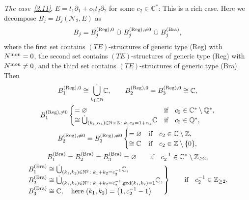 \documentclass[pdftex]{sigma}%
\numberwithin{equation}{section}
\numberwithin{figure}{section}
\newcommand{\N}{{\mathbb N}}
\newcommand{\Z}{{\mathbb Z}}
\newcommand{\Q}{{\mathbb Q}}
\newcommand{\C}{{\mathbb C}}
\newcommand{\NN}{{\mathcal N}}
\newcommand{\paa}{\partial}
\begin{document}
\begin{Remarks}
\begin{enumerate}
{\it The case~\eqref{2.11}}, $E=t_1\paa_1+c_2t_2\paa_2$
for some $c_2\in\C^*$: This is a rich case. Here we
decompose $B_j=B_j(\NN_2,E)$ as
\begin{gather*}%
B_j=B_j^{({\rm Reg}),0}
\ \dot\cup\ B_j^{({\rm Reg}),\neq 0}
\ \dot\cup\ B_j^{({\rm Bra})},
\end{gather*}
where the first set contains $(TE)$-structures of generic
type (Reg) with $N^{\rm mon}=0$, the second set contains
$(TE)$-structures of generic type (Reg) with $N^{\rm mon}\neq 0$,
and the third set contains $(TE)$-structures of
generic type (Bra). Then
\begin{gather*}%
B_1^{({\rm Reg}),0}\cong \dot{\bigcup\limits_{k_1\in\N}}\C,\qquad
B_2^{({\rm Reg}),0}=B_3^{({\rm Reg}),0}\cong\C,
\\
B_1^{({\rm Reg}),\neq 0}
\begin{cases}
=\varnothing&\text{if}\quad c_2\in\C^*\setminus\Q^*,
\\
\cong\dot\bigcup_{(k_1,\alpha_4)\in\N\times\Z\colon k_1c_2=1+\alpha_4}\C
&\text{if}\quad c_2\in\Q^*,
\end{cases} %
\\
B_2^{({\rm Reg}),\neq 0}=B_3^{({\rm Reg}),\neq 0}
\begin{cases}
=\varnothing&\text{if}\quad c_2\in\C\setminus\Z,
\\
\cong \C&\text{if}\quad c_2\in\Z\setminus\{0\},
\end{cases}
\\%
B_1^{({\rm Bra})}=B_2^{({\rm Bra})}=B_3^{({\rm Bra})}=\varnothing
\qquad\text{if}\quad c_2^{-1}\in\C^*\setminus \Z_{\geq 2},
\\
\left.\!\!\! \begin{array}{l}
B_1^{({\rm Bra})} \cong\dot
\bigcup_{(k_1,k_2)\in\N^2\colon k_1+k_2=c_2^{-1}}\C,\\
B_2^{({\rm Bra})} \cong\dot
\bigcup_{(k_1,k_2)\in\N^2\colon k_1+k_2=c_2^{-1},\gcd(k_1,k_2)=1}
\C,\\
B_3^{({\rm Bra})} \cong\C,\quad\text{here }(k_1,k_2)=\big(1,c_2^{-1}-1\big)
\end{array}\!\!\right\}\qquad\text{if}\quad c_2^{-1}\in \Z_{\geq 2}.
\nonumber
\end{gather*}
\end{enumerate}
\end{Remarks}
\end{document}
